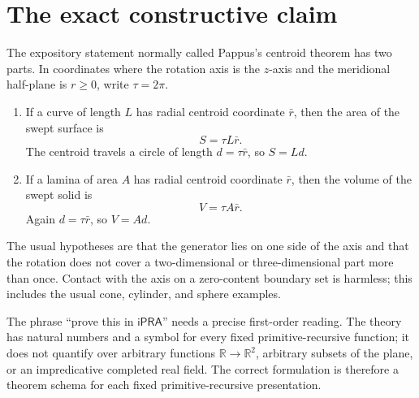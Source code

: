 \documentclass[11pt]{article}
\theoremstyle{definition}
\newcommand{\R}{\mathbb R}
\newcommand{\ipra}{\mathsf{iPRA}}
\begin{document}
\section{The exact constructive claim}
\label{sec:claim}

The expository statement normally called Pappus's centroid theorem has two
parts.  In coordinates where the rotation axis is the \(z\)-axis and the
meridional half-plane is \(r\geq0\), write \(\tau=2\pi\).

\begin{enumerate}[label=\textbf{(S\arabic*)},leftmargin=2.7em]
\item If a curve of length \(L\) has radial centroid coordinate \(\bar r\),
then the area of the swept surface is
\[
  S=\tau L\bar r.
\]
The centroid travels a circle of length \(d=\tau\bar r\), so \(S=Ld\).

\item If a lamina of area \(A\) has radial centroid coordinate \(\bar r\),
then the volume of the swept solid is
\[
  V=\tau A\bar r.
\]
Again \(d=\tau\bar r\), so \(V=Ad\).
\end{enumerate}

The usual hypotheses are that the generator lies on one side of the axis and
that the rotation does not cover a two-dimensional or three-dimensional part
more than once.  Contact with the axis on a zero-content boundary set is
harmless; this includes the usual cone, cylinder, and sphere examples.

The phrase ``prove this in \(\ipra\)'' needs a precise first-order reading.
The theory has natural numbers and a symbol for every fixed primitive-recursive
function; it does not quantify over arbitrary functions \(\R\to\R^2\),
arbitrary subsets of the plane, or an impredicative completed real field.
The correct formulation is therefore a theorem schema for each fixed
primitive-recursive presentation.
\end{document}
